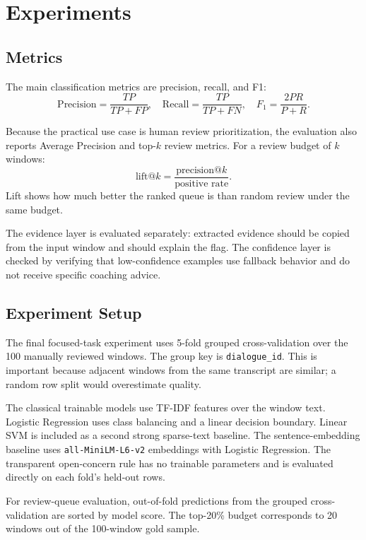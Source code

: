 \documentclass{article}
\begin{document}
\section{Experiments}
\subsection{Metrics}
The main classification metrics are precision, recall, and F1:
\[
\text{Precision}=\frac{TP}{TP+FP},\quad
\text{Recall}=\frac{TP}{TP+FN},\quad
F_1=\frac{2PR}{P+R}.
\]

Because the practical use case is human review prioritization, the evaluation also reports Average Precision and top-$k$ review metrics. For a review budget of $k$ windows:
\[
\text{lift@}k = \frac{\text{precision@}k}{\text{positive rate}}.
\]
Lift shows how much better the ranked queue is than random review under the same budget.

The evidence layer is evaluated separately: extracted evidence should be copied from the input window and should explain the flag. The confidence layer is checked by verifying that low-confidence examples use fallback behavior and do not receive specific coaching advice.

\subsection{Experiment Setup}
The final focused-task experiment uses 5-fold grouped cross-validation over the 100 manually reviewed windows. The group key is \texttt{dialogue\_id}. This is important because adjacent windows from the same transcript are similar; a random row split would overestimate quality.

The classical trainable models use TF-IDF features over the window text. Logistic Regression uses class balancing and a linear decision boundary. Linear SVM is included as a second strong sparse-text baseline. The sentence-embedding baseline uses \texttt{all-MiniLM-L6-v2} embeddings with Logistic Regression. The transparent open-concern rule has no trainable parameters and is evaluated directly on each fold's held-out rows.

For review-queue evaluation, out-of-fold predictions from the grouped cross-validation are sorted by model score. The top-20\% budget corresponds to 20 windows out of the 100-window gold sample.
\end{document}

